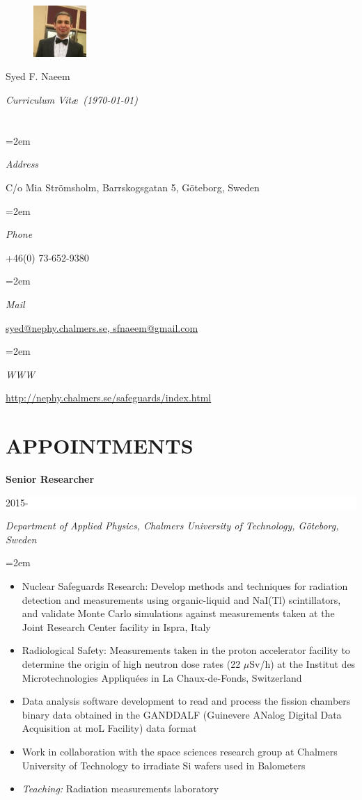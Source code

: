 \documentclass[paper=letter,fontsize=11pt]{scrartcl} %
\newlength{\spacebox}
\newcommand{\sepspace}{\vspace*{1em}}		%
\newcommand{\MyName}[1]{ %
		\Huge \usefont{OT1}{phv}{b}{n} \hfill #1
		\par \normalsize \normalfont}
\newcommand{\MySlogan}[1]{ %
		\large \usefont{OT1}{phv}{m}{n}\hfill \textit{#1}
		\par \normalsize \normalfont}
\newcommand{\NewPart}[2]{\section*{\uppercase{#1} #2}}
\newcommand{\PersonalEntry}[2]{
		\noindent\hangindent=2em\hangafter=0 %
		\parbox{\spacebox}{        %
		\textit{#1}}		       %
		\hspace{1.5em} #2 \par}    %
\newcommand{\EducationEntry}[4]{
		\noindent \textbf{#1} \hfill      %
		\colorbox{White}{%
			\parbox{6em}{%
			\hfill\color{Black}#2}} \par  %
		\noindent \textit{#3} \par        %
		\noindent\hangindent=2em\hangafter=0 \small #4 %
		\normalsize \par}
\begin{document}

\begin{figure}
	\vspace*{-2em}
		\includegraphics[width=0.18\textwidth]{Fahad.jpg}
\end{figure}

\MyName{Syed F. Naeem}
\MySlogan{Curriculum Vit\ae\ (\today)}

\sepspace

\NewPart{}{}

\PersonalEntry{Address}{C/o Mia Strömsholm, Barrskogsgatan 5, Göteborg, Sweden}
\PersonalEntry{Phone}{+46(0) 73-652-9380}
\PersonalEntry{Mail}{\href{mailto:syed@nephy.chalmers.se, sfnaeem@gmail.com}{syed@nephy.chalmers.se, sfnaeem@gmail.com}}
\PersonalEntry{WWW}{\href{http://nephy.chalmers.se/safeguards/index.html}{http://nephy.chalmers.se/safeguards/index.html}}


\NewPart{Appointments}{}


\EducationEntry{Senior Researcher}{2015-$\qquad$}{Department of Applied Physics, Chalmers University of Technology, Göteborg, Sweden}{\begin{itemize}
\item{Nuclear Safeguards Research: Develop methods and techniques for radiation detection and measurements using organic-liquid and NaI(Tl) scintillators, and validate Monte Carlo simulations against measurements taken at the Joint Research Center facility in Ispra, Italy}
\item{Radiological Safety: Measurements taken in the proton accelerator facility to determine the origin of high neutron dose rates (22 \(\mu\)Sv/h) at the Institut des Microtechnologies Appliquées in La Chaux-de-Fonds, Switzerland}
\item{Data analysis software development to read and process the fission chambers binary data obtained in the GANDDALF (Guinevere ANalog Digital Data Acquisition at moL Facility) data format}
\item{Work in collaboration with the space sciences research group at Chalmers University of Technology to irradiate Si wafers used in Balometers}
\item{\textit{Teaching:} Radiation measurements laboratory}\end{itemize}}
\sepspace
\end{document}
